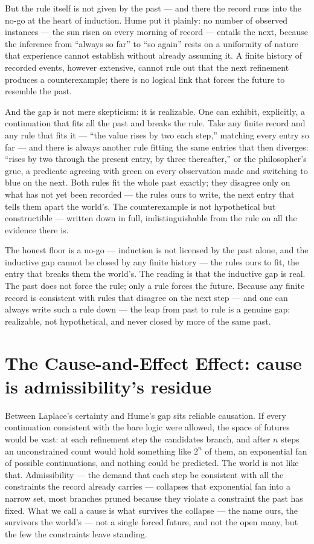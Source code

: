 But the rule itself is not given by the past --- and there the record runs into the no-go at the heart
of induction. Hume put it plainly: no number of observed instances --- the sun risen on every morning of record
--- entails the next, because the inference from ``always so far'' to ``so again'' rests on a uniformity of
nature that experience cannot establish without already assuming it. A finite history of recorded events,
however extensive, cannot rule out that the next refinement produces a counterexample; there is no logical link
that forces the future to resemble the past.

And the gap is not mere skepticism: it is realizable. One can exhibit, explicitly, a continuation that fits all
the past and breaks the rule. Take any finite record and any rule that fits it --- ``the value rises by two
each step,'' matching every entry so far --- and there is always another rule fitting the same entries that then
diverges: ``rises by two through the present entry, by three thereafter,'' or the philosopher's grue, a
predicate agreeing with green on every observation made and switching to blue on the next. Both rules fit the
whole past exactly; they disagree only on what has not yet been recorded --- the rules ours to write, the next
entry that tells them apart the world's. The counterexample is not
hypothetical but constructible --- written down in full, indistinguishable from the rule on all the evidence
there is.

The honest floor is a no-go --- induction is not licensed by the past alone, and the inductive gap cannot be
closed by any finite history --- the rules ours to fit, the entry that breaks them the world's. The reading is
that the inductive gap is real. The past does not force the rule;
only a rule forces the future. Because any finite record is consistent with rules that disagree on the next
step --- and one can always write such a rule down --- the leap from past to rule is a genuine gap: realizable,
not hypothetical, and never closed by more of the same past.

\section{The Cause-and-Effect Effect: cause is admissibility's residue}
\label{se:cause-effect}

Between Laplace's certainty and Hume's gap sits reliable causation. If every continuation consistent with the
bare logic were allowed, the space of futures would be vast: at each refinement step the candidates branch, and
after $n$ steps an unconstrained count would hold something like $2^n$ of them, an exponential fan of possible
continuations, and nothing could be predicted. The world is not like that. Admissibility --- the demand that
each step be consistent with all the constraints the record already carries --- collapses that exponential fan
into a narrow set, most branches pruned because they violate a constraint the past has fixed. What we call a
cause is what survives the collapse --- the name ours, the survivors the world's --- not a single forced
future, and not the open many, but the few the
constraints leave standing.

